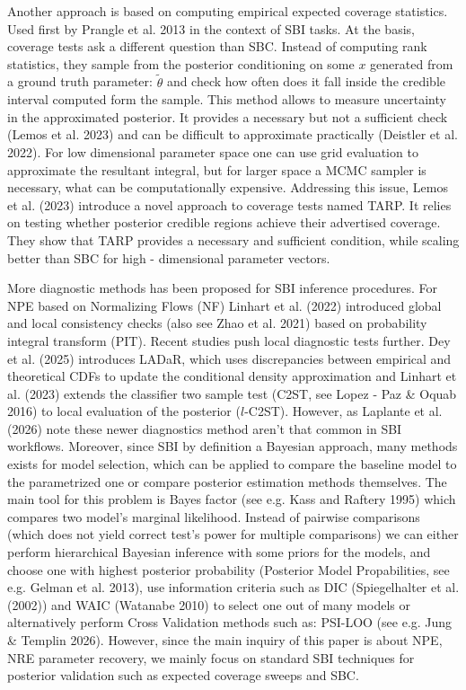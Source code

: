 \documentclass[12pt]{article}
\begin{document}
Another approach is based on computing empirical expected coverage statistics. Used first by Prangle et al. 2013 in the context of SBI tasks. At the basis, coverage tests ask a different question than SBC. Instead of computing rank statistics, they sample from the posterior conditioning on some $x$ generated from a ground truth parameter: $\tilde{\theta}$ and check how often does it fall inside the credible interval computed form the sample. This method allows to measure uncertainty in the approximated posterior. It provides a necessary but not a sufficient check (Lemos et al. 2023) and can be difficult to approximate practically (Deistler et al. 2022). For low dimensional parameter space one can use grid evaluation to approximate the resultant integral, but for larger space a MCMC sampler is necessary, what can be computationally expensive. Addressing this issue, Lemos et al. (2023) introduce a novel approach to coverage tests named TARP. It relies on testing whether posterior credible regions achieve their advertised coverage. They show that TARP provides a necessary and sufficient condition, while scaling better than SBC for high - dimensional parameter vectors. 

More diagnostic methods has been proposed for SBI inference procedures. For NPE based on Normalizing Flows (NF) Linhart et al. (2022) introduced global and local consistency checks (also see Zhao et al. 2021) based on probability integral transform (PIT). Recent studies push local diagnostic tests further. Dey et al. (2025) introduces LADaR, which uses discrepancies between empirical and theoretical CDFs to update the conditional density approximation and Linhart et al. (2023) extends the classifier two sample test (C2ST, see Lopez - Paz \& Oquab 2016) to local evaluation of the posterior ($l$-C2ST). However, as Laplante et al. (2026) note these newer diagnostics method aren't that common in SBI workflows. Moreover, since SBI by definition a Bayesian approach, many methods exists for model selection, which can be applied to compare the baseline model to the parametrized one or compare posterior estimation methods themselves. The main tool for this problem is Bayes factor (see e.g. Kass and Raftery 1995) which compares two model's marginal likelihood. Instead of pairwise comparisons (which does not yield correct test's power for multiple comparisons) we can either perform hierarchical Bayesian inference with some priors for the models, and choose one with highest posterior probability (Posterior Model Propabilities, see e.g. Gelman et al. 2013), use information criteria such as DIC (Spiegelhalter et al. (2002)) and WAIC (Watanabe 2010) to select one out of many models or alternatively perform Cross Validation methods such as: PSI-LOO (see e.g. Jung \& Templin 2026). However, since the main inquiry of this paper is about NPE, NRE parameter recovery, we mainly focus on standard SBI techniques for posterior validation such as expected coverage sweeps and SBC.
\end{document}
